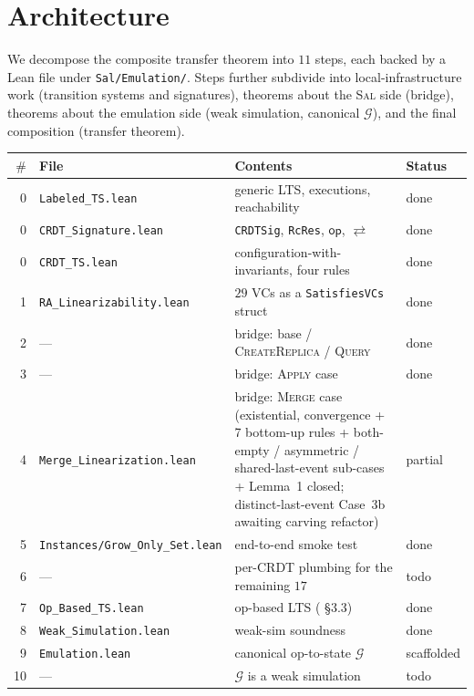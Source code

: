 \documentclass[11pt,a4paper]{article}
\theoremstyle{definition}
\theoremstyle{remark}
\newcommand{\Op}{\mathsf{op}}
\newcommand{\commute}{\mathrel{\rightleftarrows}}
\newcommand{\Sal}{\textsc{Sal}}
\newcommand{\Emul}{\mathcal{G}}
\begin{document}
\section{Architecture}
\label{sec:architecture}

We decompose the composite transfer theorem into $11$ steps, each
backed by a Lean file under \texttt{Sal/Emulation/}. Steps further
subdivide into local-infrastructure work (transition systems and
signatures), theorems about the \Sal{} side (bridge), theorems
about the emulation side (weak simulation, canonical $\Emul$), and
the final composition (transfer theorem).

\begin{table}[t]
  \centering
  \small
  \begin{tabular}{@{}rlp{7.8cm}l@{}}
    \toprule
    $\#$ & File & Contents & Status \\
    \midrule
    0 & \texttt{Labeled\_TS.lean} & generic LTS, executions, reachability & done \\
    0 & \texttt{CRDT\_Signature.lean} & \texttt{CRDTSig}, \texttt{RcRes}, $\Op$, $\commute$ & done \\
    0 & \texttt{CRDT\_TS.lean} & configuration-with-invariants, four rules & done \\
    1 & \texttt{RA\_Linearizability.lean} & $29$ VCs as a \texttt{SatisfiesVCs} struct & done \\
    2 & --- & bridge: base / \textsc{CreateReplica} / \textsc{Query} & done \\
    3 & --- & bridge: \textsc{Apply} case & done \\
    4 & \texttt{Merge\_Linearization.lean} & bridge: \textsc{Merge} case (existential, convergence + 7 bottom-up rules + both-empty / asymmetric / shared-last-event sub-cases + Lemma~1 closed; distinct-last-event Case~3b awaiting carving refactor) & partial \\
    5 & \texttt{Instances/Grow\_Only\_Set.lean} & end-to-end smoke test & done \\
    6 & --- & per-CRDT plumbing for the remaining $17$ & todo \\
    7 & \texttt{Op\_Based\_TS.lean} & op-based LTS (\cite{liittschwager2025} \S3.3) & done \\
    8 & \texttt{Weak\_Simulation.lean} & weak-sim soundness & done \\
    9 & \texttt{Emulation.lean} & canonical op-to-state $\Emul$ & scaffolded \\
    10 & --- & $\Emul$ is a weak simulation & todo \\

\end{tabular}
\end{table}
\end{document}
